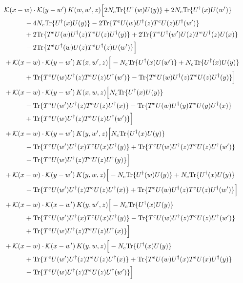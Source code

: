 \documentclass[10pt]{article}
\numberwithin{equation}{section}
\begin{document}
\begin{align}
&\mathcal K(x-w)\cdot\mathcal K(y-w')\,K(w,w',z)\Big[2 N_c{\rm Tr}\{U^\dagger(w)U(y)\}+2 N_c{\rm Tr}\{U^\dagger(x)U(w')\}\notag\\
&\quad\quad\quad-4 N_c{\rm Tr}\{U^\dagger(x)U(y)\}-2{\rm Tr}\{T^eU(w)U^\dagger(z)T^eU(z)U^\dagger(w')\}\notag\\
&\quad\quad\quad+2{\rm Tr}\{T^eU(w)U^\dagger(z)T^eU(z)U^\dagger(y)\}+2{\rm Tr}\{T^eU^\dagger(w')U(z)T^eU^\dagger(z)U(x)\}\notag\\
&\quad\quad\quad-2{\rm Tr}\{T^eU^\dagger(w)U(z)T^eU^\dagger(z)U(w')\}\Big]\notag\\
&+\mathcal K(x-w)\cdot\mathcal K(y-w')\,K(x,w',z)\Big[-N_c{\rm Tr}\{U^\dagger(x)U(w')\}+N_c{\rm Tr}\{U^\dagger(x)U(y)\}\notag\\
&\quad\quad\quad+{\rm Tr}\{T^eU(w)U^\dagger(z)T^eU(z)U^\dagger(w')\}-{\rm Tr}\{T^eU(w)U^\dagger(z)T^eU(z)U^\dagger(y)\}\Big]\notag\\
&+\mathcal K(x-w)\cdot\mathcal K(y-w')\,K(x,w,z)\Big[N_c{\rm Tr}\{U^\dagger(x)U(y)\}\notag\\
&\quad\quad\quad-{\rm Tr}\{T^eU(w')U^\dagger(z)T^eU(z)U^\dagger(x)\}-{\rm Tr}\{T^eU(w)U^\dagger(y)T^eU(y)U^\dagger(x)\}\notag\\
&\quad\quad\quad+{\rm Tr}\{T^eU(w)U^\dagger(z)T^eU(z)U^\dagger(w')\}\Big]\notag\\
&+\mathcal K(x-w)\cdot\mathcal K(y-w')\,K(y,w',z)\Big[N_c{\rm Tr}\{U^\dagger(x)U(y)\}\notag\\
&\quad\quad\quad-{\rm Tr}\{T^eU(w')U^\dagger(x)T^eU(x)U^\dagger(y)\}+{\rm Tr}\{T^eU(w)U^\dagger(z)T^eU(z)U^\dagger(w')\}\notag\\
&\quad\quad\quad-{\rm Tr}\{T^eU(w)U^\dagger(z)T^eU(z)U^\dagger(y)\}\Big]\notag\\
&+\mathcal K(x-w)\cdot\mathcal K(y-w')\,K(y,w,z)\Big[-N_c{\rm Tr}\{U^\dagger(w)U(y)\}+N_c{\rm Tr}\{U^\dagger(x)U(y)\}\notag\\
&\quad\quad\quad-{\rm Tr}\{T^eU(w')U^\dagger(z)T^eU(z)U^\dagger(x)\}+{\rm Tr}\{T^eU(w)U^\dagger(z)T^eU(z)U^\dagger(w')\}\Big]\notag\\
&+\mathcal K(x-w)\cdot\mathcal K(x-w')\,K(y,w',z)\Big[-N_c{\rm Tr}\{U^\dagger(x)U(y)\}\notag\\
&\quad\quad\quad+{\rm Tr}\{T^eU(w')U^\dagger(x)T^eU(x)U^\dagger(y)\}-{\rm Tr}\{T^eU(w)U^\dagger(z)T^eU(z)U^\dagger(w')\}\notag\\
&\quad\quad\quad+{\rm Tr}\{T^eU(w)U^\dagger(z)T^eU(z)U^\dagger(x)\}\Big]\notag\\
&+\mathcal K(x-w)\cdot\mathcal K(x-w')\,K(y,w,z)\Big[-N_c{\rm Tr}\{U^\dagger(x)U(y)\}\notag\\
&\quad\quad\quad+{\rm Tr}\{T^eU(w')U^\dagger(z)T^eU(z)U^\dagger(x)\}+{\rm Tr}\{T^eU(w)U^\dagger(x)T^eU(x)U^\dagger(y)\}\notag\\
&\quad\quad\quad-{\rm Tr}\{T^eU(w)U^\dagger(z)T^eU(z)U^\dagger(w')\}\Big]
\label{eq:G3III}
\end{align}
\end{document}
